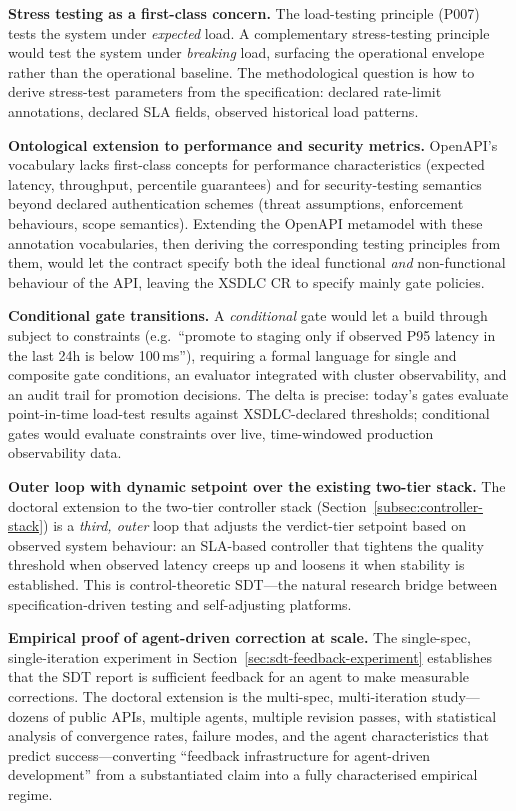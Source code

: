 \textbf{Stress testing as a first-class concern.} The load-testing principle (P007) tests the system under \emph{expected} load. A complementary stress-testing principle would test the system under \emph{breaking} load, surfacing the operational envelope rather than the operational baseline. The methodological question is how to derive stress-test parameters from the specification: declared rate-limit annotations, declared SLA fields, observed historical load patterns.

\textbf{Ontological extension to performance and security metrics.} OpenAPI's vocabulary lacks first-class concepts for performance characteristics (expected latency, throughput, percentile guarantees) and for security-testing semantics beyond declared authentication schemes (threat assumptions, enforcement behaviours, scope semantics). Extending the OpenAPI metamodel with these annotation vocabularies, then deriving the corresponding testing principles from them, would let the contract specify both the ideal functional \emph{and} non-functional behaviour of the API, leaving the XSDLC CR to specify mainly gate policies.

\textbf{Conditional gate transitions.} A \emph{conditional} gate would let a build through subject to constraints (e.g.\ ``promote to staging only if observed P95 latency in the last 24h is below 100\,ms''), requiring a formal language for single and composite gate conditions, an evaluator integrated with cluster observability, and an audit trail for promotion decisions. The delta is precise: today's gates evaluate point-in-time load-test results against XSDLC-declared thresholds; conditional gates would evaluate constraints over live, time-windowed production observability data.

\textbf{Outer loop with dynamic setpoint over the existing two-tier stack.} The doctoral extension to the two-tier controller stack (Section~\ref{subsec:controller-stack}) is a \emph{third, outer} loop that adjusts the verdict-tier setpoint based on observed system behaviour: an SLA-based controller that tightens the quality threshold when observed latency creeps up and loosens it when stability is established. This is control-theoretic SDT---the natural research bridge between specification-driven testing and self-adjusting platforms.

\textbf{Empirical proof of agent-driven correction at scale.} The single-spec, single-iteration experiment in Section~\ref{sec:sdt-feedback-experiment} establishes that the SDT report is sufficient feedback for an agent to make measurable corrections. The doctoral extension is the multi-spec, multi-iteration study---dozens of public APIs, multiple agents, multiple revision passes, with statistical analysis of convergence rates, failure modes, and the agent characteristics that predict success---converting ``feedback infrastructure for agent-driven development'' from a substantiated claim into a fully characterised empirical regime.

